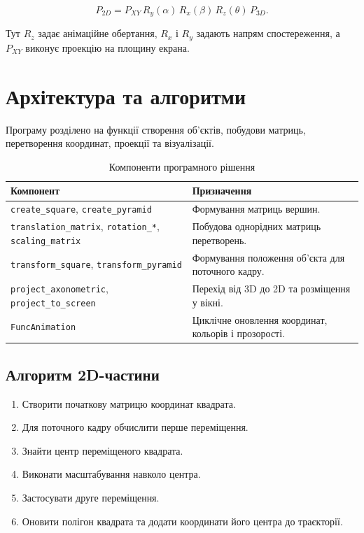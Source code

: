 \documentclass[12pt,a4paper]{article}
\begin{document}
\begin{equation}
P_{2D}=P_{XY}\,R_y(\alpha)\,R_x(\beta)\,R_z(\theta)\,P_{3D}.
\end{equation}

Тут \(R_z\) задає анімаційне обертання, \(R_x\) і \(R_y\) задають напрям спостереження, а \(P_{XY}\) виконує проекцію на площину екрана.

\section{Архітектура та алгоритми}

Програму розділено на функції створення об’єктів, побудови матриць, перетворення координат, проекції та візуалізації.

\begin{table}[H]
  \centering
  \renewcommand{\arraystretch}{1.2}
  \begin{tabular}{|p{6.2cm}|p{8.2cm}|}
    \hline
    \textbf{Компонент} & \textbf{Призначення} \\
    \hline
    \texttt{create\_square}, \texttt{create\_pyramid} & Формування матриць вершин. \\
    \hline
    \texttt{translation\_matrix}, \texttt{rotation\_*}, \texttt{scaling\_matrix} & Побудова однорідних матриць перетворень. \\
    \hline
    \texttt{transform\_square}, \texttt{transform\_pyramid} & Формування положення об’єкта для поточного кадру. \\
    \hline
    \texttt{project\_axonometric}, \texttt{project\_to\_screen} & Перехід від 3D до 2D та розміщення у вікні. \\
    \hline
    \texttt{FuncAnimation} & Циклічне оновлення координат, кольорів і прозорості. \\
    \hline
  \end{tabular}
  \caption{Компоненти програмного рішення}
\end{table}

\subsection{Алгоритм 2D-частини}

\begin{enumerate}[leftmargin=*,itemsep=0.25em]
  \item Створити початкову матрицю координат квадрата.
  \item Для поточного кадру обчислити перше переміщення.
  \item Знайти центр переміщеного квадрата.
  \item Виконати масштабування навколо центра.
  \item Застосувати друге переміщення.
  \item Оновити полігон квадрата та додати координати його центра до траєкторії.
\end{enumerate}
\end{document}
